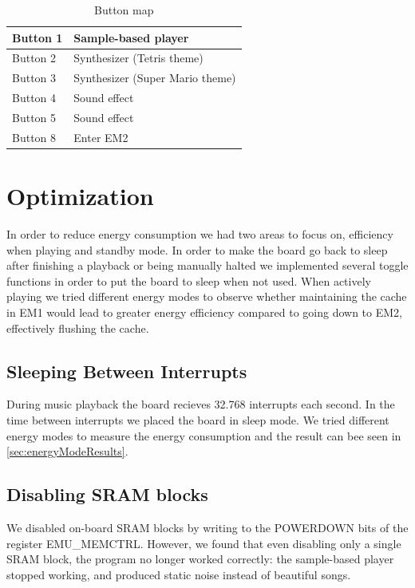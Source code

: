 \begin{table}[H]
	\begin{center}
	\begin{tabular}{ |l|l| }
	  \hline
      Button 1 & Sample-based player \\
	  \hline
      Button 2 & Synthesizer (Tetris theme)  \\
	  \hline
      Button 3 & Synthesizer (Super Mario theme)  \\
	  \hline
      Button 4 & Sound effect \\
	  \hline
      Button 5 & Sound effect \\
	  \hline
      Button 8 & Enter EM2\\
	  \hline
	\end{tabular}
	\caption{Button map}
	\label{tab:button-map}
	\end{center}
\end{table}


\section{Optimization}
In order to reduce energy consumption we had two areas to focus on, efficiency when playing and standby mode. In order to make the board go back to sleep after finishing a playback or being manually halted we implemented several toggle functions in order to put the board to sleep when not used. When actively playing we tried different energy modes to observe whether maintaining the cache in EM1 would lead to greater energy efficiency compared to going down to EM2, effectively flushing the cache.

\subsection{Sleeping Between Interrupts}
During music playback the board recieves 32.768 interrupts each second. In the time between interrupts we placed the board in sleep mode. We tried different energy modes to measure the energy consumption and the result can bee seen in \ref{sec:energyModeResults}.

\subsection{Disabling SRAM blocks}
We disabled on-board SRAM blocks by writing to the POWERDOWN bits of the register EMU\_MEMCTRL. However, we found that even disabling only a single SRAM block, the program no longer worked correctly: the sample-based player stopped working, and produced static noise instead of beautiful songs.\label{dedicated-to-peter}

